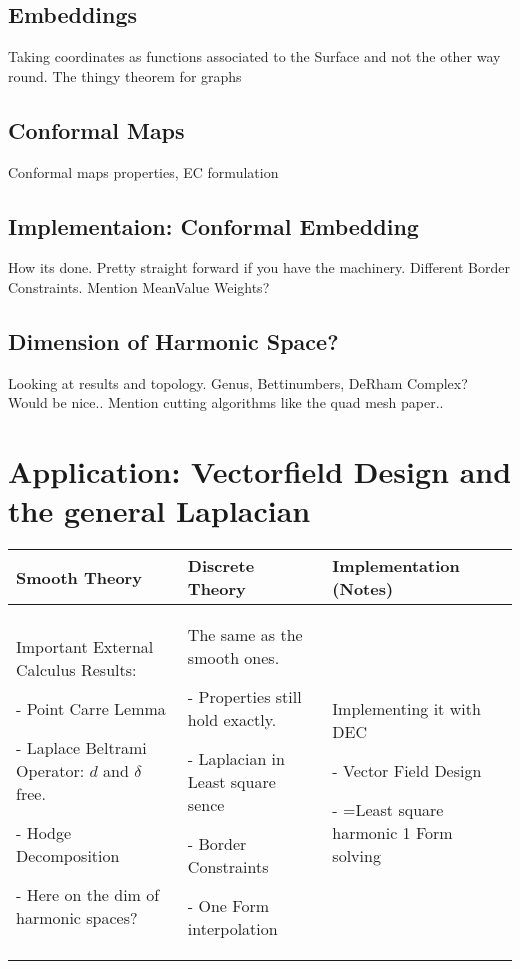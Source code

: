 \documentclass{scrartcl}
\newenvironment{packed_enum}{
\begin{enumerate}
  \setlength{\itemsep}{1pt}
  \setlength{\parskip}{0pt}
  \setlength{\parsep}{0pt}
}{\end{enumerate}}
\begin{document}
	\subsection{Embeddings}
	Taking coordinates as functions associated to the Surface and not the other way round. The thingy theorem for graphs
	\subsection{Conformal Maps}
	Conformal maps properties, EC formulation
	\subsection{Implementaion: Conformal Embedding}
		How its done. Pretty straight forward if you have the machinery. Different Border Constraints. Mention MeanValue Weights?
	\subsection{Dimension of Harmonic Space?}
		Looking at results and topology. Genus, Bettinumbers, DeRham Complex?	Would be nice..
		Mention cutting algorithms like the quad mesh paper..
\newpage	
\section{Application: Vectorfield Design and the general Laplacian}
	\begin{longtable}{|p{4.5cm}|p{4.5cm}|p{4.5cm}|}
		\hline
		Smooth Theory& Discrete Theory& Implementation (Notes)\\
		\hline
			Important External Calculus Results:
			\begin{packed_enum}
				\item[-] Point Carre Lemma
				\item[-] Laplace Beltrami Operator: $d$ and $\delta$ free.
				\item[-] Hodge Decomposition
				\item[-] Here on the dim of harmonic spaces?
			\end{packed_enum}
			&
			The same as the smooth ones.
			\begin{packed_enum}
				\item[-] Properties still hold exactly.
				\item[-] Laplacian in Least square sence
				\item[-] Border Constraints
				\item[-] One Form interpolation
			\end{packed_enum}
			 & 
			 Implementing it with DEC
			 \begin{packed_enum}
				\item[-] Vector Field Design
				\item[-] =Least square harmonic 1 Form solving
			\end{packed_enum}
			 \\		
		\hline
	\end{longtable}
\end{document}
